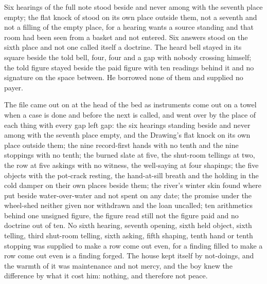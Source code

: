 Six hearings of the full note stood beside and never among with the seventh place empty; the flat knock of  stood on its own place outside them, not a seventh and not a filling of the empty place, for a hearing wants a source standing and that room had been seen from a basket and not entered. Six answers stood on the sixth place and not one called itself a doctrine. The heard bell stayed in its square beside the told bell, four, four and a gap with nobody crossing himself; the told figure stayed beside the paid figure with ten readings behind it and no signature on the space between. He borrowed none of them and supplied no payer.

The file came out on  at the head of the bed as instruments come out on a towel when a case is done and before the next is called, and went over by the place of each thing with every gap left gap: the six hearings standing beside and never among with the seventh place empty, and the Drawing's flat knock on its own place outside them; the nine record-first hands with no tenth and the nine stoppings with no tenth; the burned slate at five, the shut-room tellings at two, the row at five askings with no witness, the well-saying at four shapings; the five objects with the pot-crack resting, the hand-at-sill breath and the holding in the cold damper on their own places beside them; the river's winter skin found where put beside water-over-water and not spent on any date; the promise under the wheel-shed neither given nor withdrawn and the loan uncalled; ten arithmetics behind one unsigned figure, the figure read still not the figure paid and no doctrine out of ten. No sixth hearing, seventh opening, sixth held object, sixth telling, third shut-room telling, sixth asking, fifth shaping, tenth hand or tenth stopping was supplied to make a row come out even, for a finding filled to make a row come out even is a finding forged. The house kept itself by not-doings, and the warmth of it was maintenance and not mercy, and the boy knew the difference by what it cost him: nothing, and therefore not peace.

